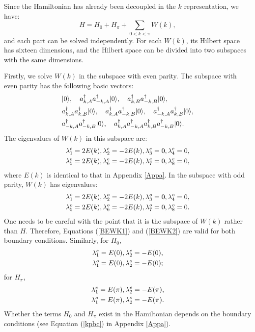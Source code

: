 \documentclass[twocolumn,floats,superscriptaddress]{revtex4}
\begin{document}
Since the Hamiltonian has already been decoupled in the $k$ representation, we have:
\begin{equation}\label{Hwk}
H=H_0+H_\pi+\sum_{0<k<\pi}W(k),
\end{equation}
and each part can be solved independently. For each $W(k)$, its Hilbert space has sixteen dimensions, and the Hilbert space can be divided into two subspaces with the same dimensions.

Firstly, we solve $W(k)$ in the subspace with even parity. The subspace with even parity has the following basic vectors:
\begin{align}\label{BBv}
&|0\rangle,\quad a_{k,A}^\dag a_{-k,A}^\dag|0\rangle,\quad a_{k,B}^\dag a_{-k,B}^\dag|0\rangle, \notag
\\
& a_{k,A}^\dag a_{k,B}^\dag|0\rangle, \quad a_{k,A}^\dag a_{-k,B}^\dag|0\rangle, \quad a_{-k,A}^\dag a_{k,B}^\dag|0\rangle, \notag
\\
&a_{-k,A}^\dag a_{-k,B}^\dag|0\rangle,\quad a_{k,A}^\dag a_{-k,A}^\dag a_{k,B}^\dag a_{-k,B}^\dag|0\rangle.
\end{align}
The eigenvalues of $W(k)$ in this subspace are:
\begin{align}\label{BEWK1}
& \lambda_1^e=2E(k), \lambda_2^e=-2E(k), \lambda_3^e=0, \lambda_4^e=0,\notag
\\
& \lambda_5^e=2E(k), \lambda_6^e=-2E(k), \lambda_7^e=0, \lambda_8^e=0,
\end{align}
where $E(k)$ is identical to that in Appendix \ref{Appa}.
In the subspace with odd parity, $W(k)$ has eigenvalues:
\begin{align}\label{BEWK2}
& \lambda_1^o=2E(k), \lambda_2^o=-2E(k), \lambda_3^o=0, \lambda_4^o=0,\notag
\\
& \lambda_5^o=2E(k), \lambda_6^o=-2E(k), \lambda_7^o=0, \lambda_8^o=0.
\end{align}
One needs to be careful with the point that it is the subspace of $W(k)$ rather than $H$. Therefore, Equations (\ref{BEWK1}) and (\ref{BEWK2}) are valid for both boundary conditions. Similarly, for $H_0$,
\begin{align}\label{BEWK20}
& \lambda_1^e=E(0), \lambda_2^e=-E(0),\notag
\\
& \lambda_1^o=E(0), \lambda_2^o=-E(0);
\end{align}
for $H_\pi$,
\begin{align}\label{BEWK2pi}
& \lambda_1^e=E(\pi), \lambda_2^e=-E(\pi),\notag
\\
& \lambda_1^o=E(\pi), \lambda_2^o=-E(\pi).
\end{align}
Whether the terms $H_0$ and $H_\pi$ exist in the Hamiltonian depends on the boundary conditions (see Equation (\ref{kpbc}) in Appendix \ref{Appa}).
\end{document}
